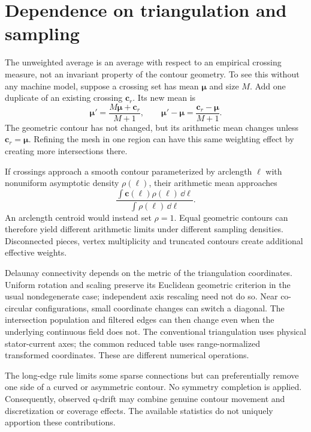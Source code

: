\section{Dependence on triangulation and sampling}
The unweighted average is an average with respect to an empirical crossing measure, not an invariant property of the contour geometry. To see this without any machine model, suppose a crossing set has mean $\bm\mu$ and size $M$. Add one duplicate of an existing crossing $\bm c_r$. Its new mean is
\begin{equation}
\bm\mu'=\frac{M\bm\mu+\bm c_r}{M+1},
\qquad
\bm\mu'-\bm\mu=\frac{\bm c_r-\bm\mu}{M+1}.
\end{equation}
The geometric contour has not changed, but its arithmetic mean changes unless $\bm c_r=\bm\mu$. Refining the mesh in one region can have this same weighting effect by creating more intersections there.

If crossings approach a smooth contour parameterized by arclength $\ell$ with nonuniform asymptotic density $\rho(\ell)$, their arithmetic mean approaches
\begin{equation}\label{eq:density-mean}
\frac{\int \bm c(\ell)\rho(\ell)\,\dd\ell}
{\int\rho(\ell)\,\dd\ell}.
\end{equation}
An arclength centroid would instead set $\rho=1$. Equal geometric contours can therefore yield different arithmetic limits under different sampling densities. Disconnected pieces, vertex multiplicity and truncated contours create additional effective weights.

Delaunay connectivity depends on the metric of the triangulation coordinates. Uniform rotation and scaling preserve its Euclidean geometric criterion in the usual nondegenerate case; independent axis rescaling need not do so. Near co-circular configurations, small coordinate changes can switch a diagonal. The intersection population and filtered edges can then change even when the underlying continuous field does not. The conventional triangulation uses physical stator-current axes; the common reduced table uses range-normalized transformed coordinates. These are different numerical operations.

The long-edge rule limits some sparse connections but can preferentially remove one side of a curved or asymmetric contour. No symmetry completion is applied. Consequently, observed q-drift may combine genuine contour movement and discretization or coverage effects. The available statistics do not uniquely apportion these contributions.

